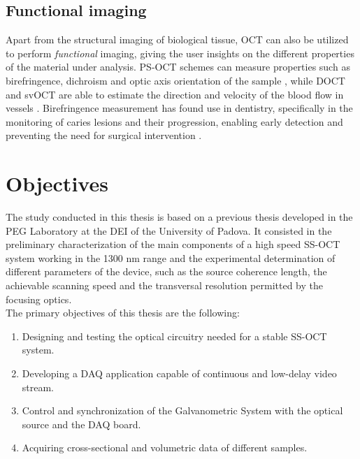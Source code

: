 \subsection{Functional imaging}
Apart from the structural imaging of biological tissue, OCT can also be utilized to perform \emph{functional} imaging, giving the user insights on the different properties of the material under analysis. \ac{PS-OCT} schemes can measure properties such as birefringence, dichroism and optic axis orientation of the sample \cite{DeBoer1997}, while \ac{DOCT} and \ac{svOCT} are able to estimate the direction and velocity of the blood flow in vessels \cite{Mahmud2013}. Birefringence measurement has found use in dentistry, specifically in the monitoring of caries lesions and their progression, enabling early detection and preventing the need for surgical intervention \cite{Fried2002}. 

\section{Objectives}
The study conducted in this thesis is based on a previous thesis \cite{Calabrese2017} developed in the \ac{PEG} Laboratory at the \ac{DEI} of the University of Padova. It consisted in the preliminary characterization of the main components of a high speed \acf{SS-OCT} system working in the 1300 nm range and the experimental determination of different parameters of the device, such as the source coherence length, the achievable scanning speed and the transversal resolution permitted by the focusing optics. \\

\noindent The primary objectives of this thesis are the following:
\begin{enumerate}
	\item Designing and testing the optical circuitry needed for a stable SS-OCT system.
	\item Developing a \ac{DAQ} application capable of continuous and low-delay video stream.
	\item Control and synchronization of the Galvanometric System with the optical source and the \ac{DAQ} board. 
	\item Acquiring cross-sectional and volumetric data of different samples.
\end{enumerate}

